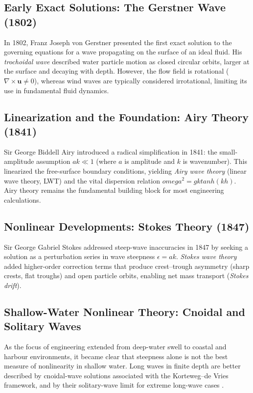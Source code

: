 \documentclass[journal,10pt,twocolumn]{IEEEtran}
\def\omega{omega}%
\def\tanh{tanh}%
\begin{document}
\subsection{Early Exact Solutions: The Gerstner Wave (1802)}
In 1802, Franz Joseph von Gerstner presented the first exact solution to the governing
equations for a wave propagating on the surface of an ideal fluid.
His \emph{trochoidal wave} described water particle motion as closed circular orbits,
larger at the surface and decaying with depth.
However, the flow field is rotational ($\nabla \times \mathbf{u} \neq 0$), whereas wind
waves are typically considered irrotational, limiting its use in fundamental fluid
dynamics.

\subsection{Linearization and the Foundation: Airy Theory (1841)}
Sir George Biddell Airy introduced a radical simplification in 1841: the small-amplitude
assumption $ak \ll 1$ (where $a$ is amplitude and $k$ is wavenumber).
This linearized the free-surface boundary conditions, yielding \emph{Airy wave theory}
(linear wave theory, LWT) and the vital dispersion relation
$\omega^2 = gk \tanh(kh)$.
Airy theory remains the fundamental building block for most engineering calculations.

\subsection{Nonlinear Developments: Stokes Theory (1847)}
Sir George Gabriel Stokes addressed steep-wave inaccuracies in 1847 by seeking a
solution as a perturbation series in wave steepness $\epsilon = ak$.
\emph{Stokes wave theory} added higher-order correction terms that produce crest--trough
asymmetry (sharp crests, flat troughs) and open particle orbits, enabling net mass
transport (\emph{Stokes drift}).

\subsection{Shallow-Water Nonlinear Theory: Cnoidal and Solitary Waves}
As the focus of engineering extended from deep-water swell to coastal and harbour
environments, it became clear that steepness alone is not the best measure of
nonlinearity in shallow water.
Long waves in finite depth are better described by cnoidal-wave solutions associated
with the Korteweg--de Vries framework, and by their solitary-wave limit for extreme
long-wave cases \cite{LeMehaute1976,Fenton1990,DNVC205}.
\end{document}
